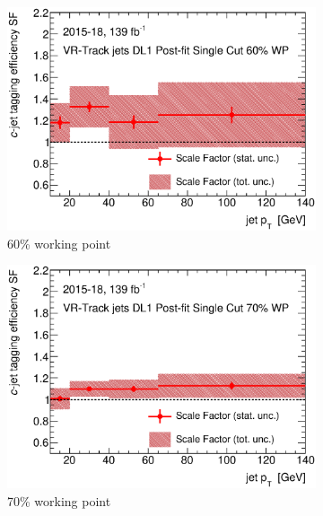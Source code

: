 \documentclass[letterpaper,12pt]{article}
\begin{document}
\begin{figure}[H]
	\centering
	\begin{subfigure}[t]{.35\linewidth}
		\includegraphics[width=1\textwidth]{FTAG_plots/DL1allVRJetsDec/SF60.eps}
		\caption{60\% working point}
			\end{subfigure}
		\begin{subfigure}[t]{.35\linewidth}
			\includegraphics[width=1\textwidth]{FTAG_plots/DL1allVRJetsDec/SF70.eps}
			\caption{70\% working point}
		\end{subfigure}
		\begin{subfigure}[t]{.35\linewidth}

\end{subfigure}
\end{figure}
\end{document}
